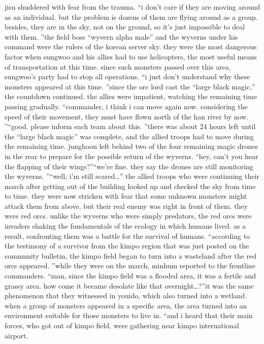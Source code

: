 jisu shuddered with fear from the trauma.
“i don’t care if they are moving around as an individual.
 but the problem is dozens of them are flying around as a group.
 besides, they are in the sky, not on the ground, so it’s just impossible to deal with them.
”the field boss “wyvern alpha male” and the wyverns under his command were the rulers of the korean server sky.
 they were the most dangerous factor when sungwoo and his allies had to use helicopters, the most useful means of transportation at this time.
since such monsters passed over this area, sungwoo’s party had to stop all operations.
“i just don’t understand why these monsters appeared at this time.
”since the orc lord cast the “large black magic,” the countdown continued.
the allies were impatient, watching the remaining time passing gradually.
“commander, i think i can move again now.
 considering the speed of their movement, they must have flown north of the han river by now.
”“good.
 please inform each team about this.
”there was about 24 hours left until the “large black magic” was complete, and the allied troops had to move during the remaining time.
junghoon left behind two of the four remaining magic drones in the rear to prepare for the possible return of the wyverns.
“hey, can’t you hear the flapping of their wings?”“we’re fine.
 they say the drones are still monitoring the wyverns.
”“well, i’m still scared…”
the allied troops who were continuing their march after getting out of the building looked up and checked the sky from time to time.
 they were now stricken with fear that some unknown monsters might attack them from above.
but their real enemy was right in front of them.
 they were red orcs.
unlike the wyverns who were simply predators, the red orcs were invaders shaking the fundamentals of the ecology in which humans lived.
 as a result, confronting them was a battle for the survival of humans.
“according to the testimony of a survivor from the kimpo region that was just posted on the community bulletin, the kimpo field began to turn into a wasteland after the red orcs appeared.
”while they were on the march, minhum reported to the frontline commanders.
“man, since the kimpo field was a flooded area, it was a fertile and grassy area.
 how come it became desolate like that overnight…?”it was the same phenomenon that they witnessed in youido, which also turned into a wetland.
 when a group of monsters appeared in a specific area, the area turned into an environment suitable for those monsters to live in.
“and i heard that their main forces, who got out of kimpo field, were gathering near kimpo international airport.
